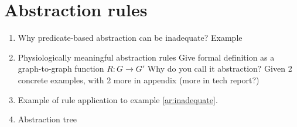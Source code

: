 \section{Abstraction rules}
\label{abstractionRules}

\begin{enumerate}
	\item Why predicate-based abstraction can be inadequate? Example
	\label{ar:inadequate}
	\item Physiologically meaningful abstraction rules
	\subitem Give formal definition as a graph-to-graph function $R: G \rightarrow G'$ 
	\subitem Why do you call it abstraction? 
	\subitem Given 2 concrete examples, with 2 more in appendix (more in tech report?)
	\item Example of rule application to example \ref{ar:inadequate}.
	\item Abstraction tree		
\end{enumerate}